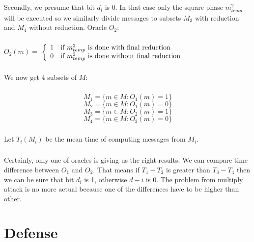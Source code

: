 \documentclass[thesis=B,english]{FITthesis}[2012/10/20]
\begin{document}
{\paragraph*{}{
Secondly, we presume that bit \(d_i\) is 0. In that case only the square phase \(m_{temp}^2\) will be executed so we similarly divide messages to subsets \(M_3\) with reduction and 
\(M_4\) without reduction. Oracle \(O_2\):
}


\paragraph*{}
\( O_2(m) =\) $\left\{
  \begin{array}{cl}
    \text{1} & \text{\mbox{if}  \(m_{temp}^2\) is done with final reduction} \\
    \text{0} & \text{\mbox{if}  \(m_{temp}^2\) is done without final reduction} 
  \end{array}
\right.$

\paragraph*{}{
We now get 4 subsets of \(M\):
}
\paragraph*{}
\[M_1 = \{m \in M : O_1(m) = 1\}\]
\[M_2 = \{m \in M : O_1(m) = 0\}\]
\[M_3 = \{m \in M : O_2(m) = 1\}\]
\[M_4 = \{m \in M : O_2(m) = 0\}\]

\paragraph*{}
{Let \(T_i(M_i)\) be the mean time of computing messages from \(M_i\). }


\paragraph*{}{
Certainly, only one of oracles is giving us the right results. We can compare time difference between \( O_1 \) and \(O_2\). That means if \(T_1 - T_2 \) is greater than 
\(T_3 - T_4\) then we can be sure that bit \(d_i\) is 1, otherwise \(d-i\) is 0. The problem from multiply attack is no more actual because one of the differences have to be higher
than other.
}


\chapter{Defense}
}
\end{document}
